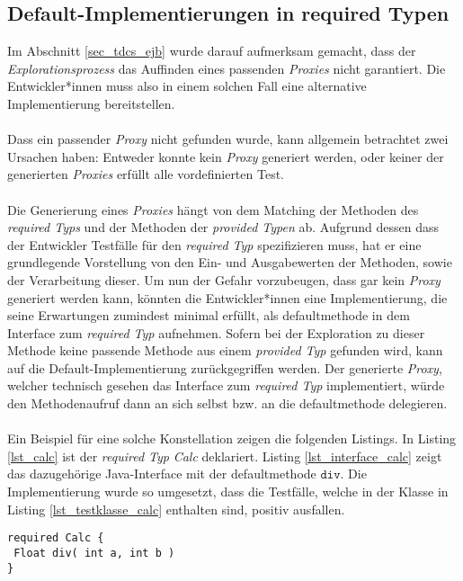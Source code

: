 \subsection{Default-Implementierungen in required Typen}
Im Abschnitt \ref{sec_tdcs_ejb} wurde darauf aufmerksam gemacht, dass der \emph{Explorationsprozess} das Auffinden eines passenden \emph{Proxies} nicht garantiert. Die Entwickler*innen muss also in einem solchen Fall eine alternative Implementierung bereitstellen.
\\\\
Dass ein passender \emph{Proxy} nicht gefunden wurde, kann allgemein betrachtet zwei Ursachen haben: Entweder konnte kein \emph{Proxy} generiert werden, oder keiner der generierten \emph{Proxies} erfüllt alle vordefinierten Test. 
\\\\
Die Generierung eines \emph{Proxies} hängt von dem Matching der Methoden des \emph{required Typs} und der Methoden der \emph{provided Typen} ab. Aufgrund dessen dass der Entwickler Testfälle für den \emph{required Typ} spezifizieren muss, hat er eine grundlegende Vorstellung von den Ein- und Ausgabewerten der Methoden, sowie der Verarbeitung dieser. Um nun der Gefahr vorzubeugen, dass gar kein \emph{Proxy} generiert werden kann, könnten die Entwickler*innen eine Implementierung, die seine Erwartungen zumindest minimal erfüllt, als \Gls{defaultmethode} in dem \Gls{Interface} zum \emph{required Typ} aufnehmen. Sofern bei der Exploration zu dieser Methode keine passende Methode aus einem \emph{provided Typ} gefunden wird, kann auf die Default-Implementierung zurückgegriffen werden. Der generierte \emph{Proxy}, welcher technisch gesehen das \Gls{Interface} zum \emph{required Typ} implementiert, würde den Methodenaufruf dann an sich selbst bzw. an die \Gls{defaultmethode} delegieren.
\\\\
Ein Beispiel für eine solche Konstellation zeigen die folgenden Listings. In Listing \ref{lst_calc} ist der \emph{required Typ} \emph{Calc} deklariert. Listing \ref{lst_interface_calc} zeigt das dazugehörige Java-Interface mit der \Gls{defaultmethode} $\texttt{div}$. Die Implementierung wurde so umgesetzt, dass die Testfälle, welche in der Klasse in Listing \ref{lst_testklasse_calc} enthalten sind, positiv ausfallen.
\begin{lstlisting}[caption={Required Typ \emph{Calc}},captionpos=b, style = dsl, label=lst_calc]
required Calc {
 Float div( int a, int b )	
}
\end{lstlisting}
